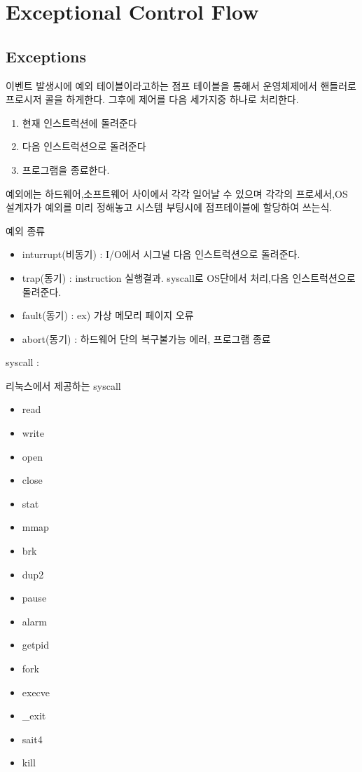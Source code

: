 
\chapter{Exceptional Control Flow}

\section{Exceptions}

이벤트 발생시에 예외 테이블이라고하는 점프 테이블을 통해서 운영체제에서 핸들러로 프로시저 콜을 하게한다.
그후에 제어를 다음 세가지중 하나로 처리한다.

\begin{enumerate}
    \item 현재 인스트럭션에 돌려준다
    \item 다음 인스트럭션으로 돌려준다 
    \item 프로그램을 종료한다.
\end{enumerate}

예외에는 하드웨어,소프트웨어 사이에서 각각 일어날 수 있으며 각각의 프로세서,OS 설계자가 예외를 미리 정해놓고 시스템 부팅시에 점프테이블에 할당하여 쓰는식.

예외 종류
\begin{itemize}
    \item inturrupt(비동기) : I/O에서 시그널  다음 인스트럭션으로 돌려준다.
    \item trap(동기) : instruction 실행결과. syscall로 OS단에서 처리,다음 인스트럭션으로 돌려준다.
    \item fault(동기) : ex) 가상 메모리 페이지 오류
    \item abort(동기) : 하드웨어 단의 복구불가능 에러, 프로그램 종료
\end{itemize}

syscall : 

리눅스에서 제공하는 syscall
\begin{itemize}
    \item read
    \item write
    \item open
    \item close
    \item stat
    \item mmap
    \item brk
    \item dup2
    \item pause
    \item alarm
    \item getpid
    \item fork
    \item execve
    \item _exit
    \item sait4
    \item kill
\end{itemize}


